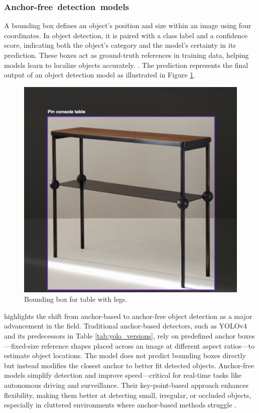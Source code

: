 \documentclass[a4paper,10pt,twocolumn]{article}
\numberwithin{figure}{section}
\numberwithin{table}{section}
\begin{document}
\vspace{0.3cm}
\subsubsection{\mbox{Anchor-free detection models}}
\vspace{0.3cm}

A bounding box defines an object's position and size within an image using four coordinates. 
In object detection, it is paired with a class label and a confidence score, indicating both the object's 
category and the model's certainty in its prediction.
These boxes act as ground-truth references in training data, helping models learn to localize objects accurately.
\citep{li2022yolov6}. The prediction represents the 
final output of an object detection model as illustrated in Figure \ref{fig:bounding}.

\begin{figure}[h]
    \centering
    \includegraphics[width=0.7\linewidth]{bounding.png}  %
    \caption{Bounding box for table with legs.}
    \label{fig:bounding}  
\end{figure}


\cite{vina2024yolo11} highlights the shift from anchor-based to anchor-free
object detection as a major advancement in the field. Traditional anchor-based 
detectors, such as YOLOv4 and its predecessors in Table 
\ref{tab:yolo_versions}, rely on predefined anchor 
boxes—fixed-size reference shapes placed across an image at different aspect 
ratios—to estimate object locations. The model does not predict bounding boxes 
directly but instead modifies the closest anchor to better fit detected objects.
Anchor-free models simplify detection and improve speed—critical for 
real-time tasks like autonomous driving and surveillance. Their
 key-point-based approach enhances flexibility, making them better at detecting small,
  irregular, or occluded objects, especially in cluttered environments 
  where anchor-based methods struggle \citep{wang2024yolov9}.
\end{document}
